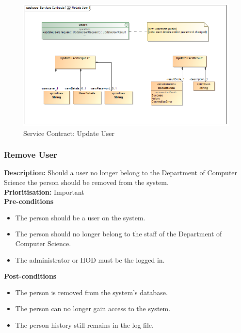 \documentclass[a4paper]{article}
\begin{document}
        	\begin{figure}[H]
        		\centering
        		\includegraphics[width=\textwidth]{5.1.3.Update.User.Services.Contract.png}
        		\caption{Service Contract: Update User}
        	\end{figure}
    \pagebreak
    \subsubsection{Remove User}
    
    \textbf{Description:} Should a user no longer belong to the Department of Computer Science the person should be removed from the system.\\
    \textbf{Prioritisation:} Important\\
    
    \textbf{Pre-conditions}
     \begin{itemize}
        \item The person should be a user on the system.
        \item The person should no longer belong to the staff of the Department of Computer Science.
        \item The administrator or HOD must be the logged in.
   \end{itemize}
    
    \textbf{Post-conditions}
    \begin{itemize}
        \item The person is removed from the system's database.
        \item The person can no longer gain access to the system.
        \item The person history still remains in the log file.
    \end{itemize}
\end{document}
